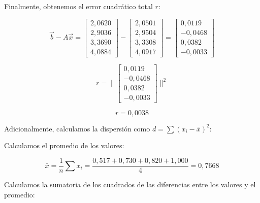 Finalmente, obtenemos el error cuadrático total $r$:

\begin{equation}
    \vec{b} - A\vec{x} =
    \begin{bmatrix}
        2{,}0620 \\
        2{,}9036 \\
        3{,}3690 \\
        4{,}0884
    \end{bmatrix}
    -
    \begin{bmatrix}
        2{,}0501 \\
        2{,}9504 \\
        3{,}3308 \\
        4{,}0917
    \end{bmatrix}
    =
    \begin{bmatrix}
        0{,}0119 \\
        -0{,}0468 \\
        0{,}0382 \\
        -0{,}0033
    \end{bmatrix}
    \label{eq:error-cuadrados-minimos-resolucion}
\end{equation}

\begin{equation}
    r = \|
    \begin{bmatrix}
        0{,}0119 \\
        -0{,}0468 \\
        0{,}0382 \\
        -0{,}0033
    \end{bmatrix}
    \| ^2
    \label{eq:error-cuadrados-minimos-resolucion-2}
\end{equation}

\begin{equation}
    r = 0{,}0038
    \label{eq:error-cuadrados-minimos-r}
\end{equation}

Adicionalmente, calculamos la dispersión como $d = \sum (x_i - \bar{x})^2$:

Calculamos el promedio de los valores:

\begin{equation}
    \bar{x} = \frac{1}{n} \sum x_i = \frac{0{,}517 + 0{,}730 + 0{,}820 + 1{,}000}{4} = 0{,}7668
    \label{eq:dispersion-cuadrados-minimos-r-promedio}
\end{equation}

Calculamos la sumatoria de los cuadrados de las diferencias entre los valores y el promedio:

